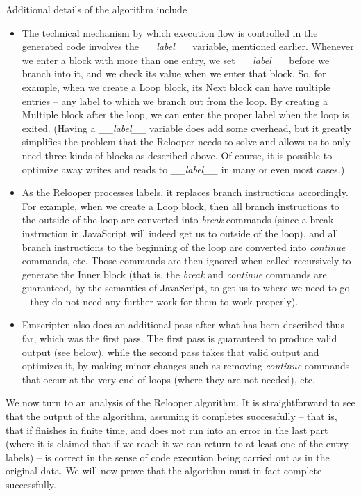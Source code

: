 \documentclass[preprint,10pt]{sigplanconf}
\begin{document}
Additional details of the algorithm include
\begin{itemize}
\item The technical mechanism by which execution flow is controlled in the generated code involves
the \emph{\_\_label\_\_} variable, mentioned earlier. Whenever we enter a block with more than one
entry, we set \emph{\_\_label\_\_} before we branch into it, and we
check its value when we enter that block. So, for example, when we
create a Loop block, its Next block can have multiple entries -- any
label to which we branch out from the loop. By creating a Multiple
block after the loop, we can enter the proper label when the loop is
exited. (Having a \emph{\_\_label\_\_} variable does add some overhead,
but it greatly simplifies the problem that the Relooper needs to solve
and allows us to only need three kinds of blocks as described above.
Of course, it is possible to optimize
away writes and reads to \emph{\_\_label\_\_} in many or even most cases.)
\item As the Relooper processes labels, it replaces branch
instructions accordingly. For example, when we create a Loop
block, then all branch instructions to the outside of the loop are
converted into \emph{break} commands (since a break instruction in JavaScript
will indeed get us to outside of the loop), and all branch
instructions to the beginning of the loop are converted into
\emph{continue} commands, etc. Those commands are then
ignored when called recursively to generate the Inner block (that is,
the \emph{break} and \emph{continue}
commands are guaranteed, by the semantics of JavaScript, to get us to
where we need to go -- they do not need any further work
for them to work properly).
\item Emscripten also does an additional pass after what has been
described thus far, which was the first pass. The first pass is guaranteed to produce valid output (see below), while
the second pass takes that valid output and optimizes it, by
making minor changes such as removing
\emph{continue} commands that occur at the very end of loops
(where they are not needed), etc.
\end{itemize}

We now turn to an analysis of the Relooper algorithm. It is straightforward to see that the output of the algorithm,
assuming it completes successfully -- that is, that if finishes in finite time, and does
not run into an error in the last part (where it is claimed that
if we reach it we can return to at least one of the entry labels) --
is correct in the sense of code execution being carried out
as in the original data. We will now prove that the algorithm must
in fact complete successfully.
\end{document}
